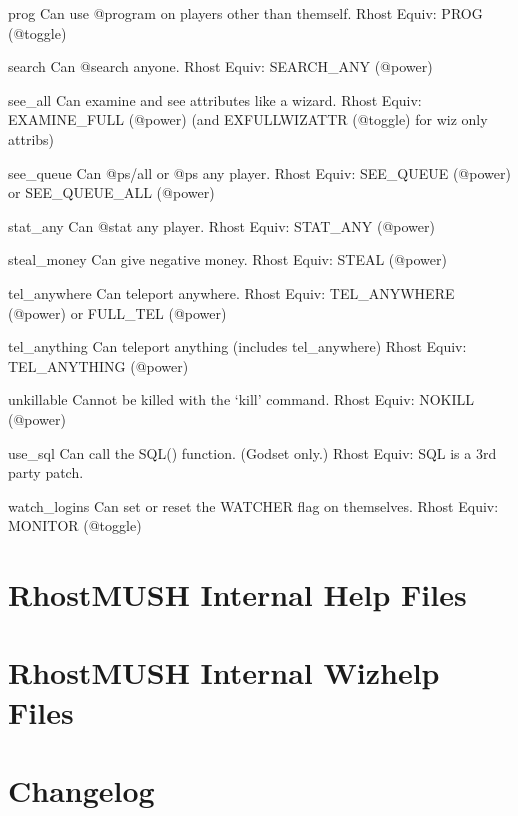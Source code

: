 \documentclass[letterpaper,10pt,english]{sphinxmanual}
\begin{document}
\sphinxAtStartPar
prog                  Can use @program on players other than themself.
Rhost Equiv: PROG (@toggle)

\sphinxAtStartPar
search                Can @search anyone.
Rhost Equiv: SEARCH\_ANY (@power)

\sphinxAtStartPar
see\_all               Can examine and see attributes like a wizard.
Rhost Equiv: EXAMINE\_FULL (@power) (and EXFULLWIZATTR (@toggle) for wiz only attribs)

\sphinxAtStartPar
see\_queue             Can @ps/all or @ps any player.
Rhost Equiv: SEE\_QUEUE (@power) or SEE\_QUEUE\_ALL (@power)

\sphinxAtStartPar
stat\_any              Can @stat any player.
Rhost Equiv: STAT\_ANY (@power)

\sphinxAtStartPar
steal\_money           Can give negative money.
Rhost Equiv: STEAL (@power)

\sphinxAtStartPar
tel\_anywhere          Can teleport anywhere.
Rhost Equiv: TEL\_ANYWHERE (@power) or FULL\_TEL (@power)

\sphinxAtStartPar
tel\_anything          Can teleport anything (includes tel\_anywhere)
Rhost Equiv: TEL\_ANYTHING (@power)

\sphinxAtStartPar
unkillable            Cannot be killed with the ‘kill’ command.
Rhost Equiv: NOKILL (@power)

\sphinxAtStartPar
use\_sql               Can call the SQL() function. (God\sphinxhyphen{}set only.)
Rhost Equiv: SQL is a 3rd party patch.

\sphinxAtStartPar
watch\_logins          Can set or reset the WATCHER flag on themselves.
Rhost Equiv: MONITOR (@toggle)


\chapter{RhostMUSH Internal Help Files}
\label{\detokenize{helpfile:rhostmush-internal-help-files}}\label{\detokenize{helpfile::doc}}



\chapter{RhostMUSH Internal Wizhelp Files}
\label{\detokenize{wizhelpfile:rhostmush-internal-wizhelp-files}}\label{\detokenize{wizhelpfile::doc}}



\chapter{Changelog}
\label{\detokenize{changelog:changelog}}\label{\detokenize{changelog:id1}}\label{\detokenize{changelog::doc}}
\end{document}
